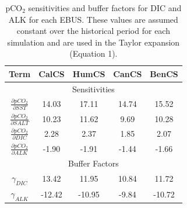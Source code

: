 \documentclass[12pt]{article}
\begin{document}
\clearpage
\begin{table}
	\centering
	\caption{pCO$_{2}$ sensitivities and buffer factors for DIC and ALK for each EBUS. These values are assumed constant over the historical period for each simulation and are used in the Taylor expansion (Equation 1).}	
	\begin{tabular}{c c c c c}
		\toprule
		Term & CalCS  &  HumCS &  CanCS & BenCS \\
		\midrule
		\multicolumn{5}{c}{Sensitivities}  \\[0.1cm]
		$\frac{\partial pCO_{2}}{\partial SST}$ &  14.03 & 17.11  & 14.74 & 15.52 \\ [0.5cm]
		$\frac{\partial pCO_{2}}{\partial SALT}$ &  10.23 & 11.62 & 9.69 & 10.28 \\ [0.5cm]
		$\frac{\partial pCO_{2}}{\partial DIC}$ &  2.28 & 2.37 & 1.85 & 2.07 \\ [0.5cm]
		$\frac{\partial pCO_{2}}{\partial ALK}$ &  -1.90 & -1.91 & -1.44 & -1.66 \\ 
		\midrule
		\multicolumn{5}{c}{Buffer Factors}  \\ [0.1cm]
		$\gamma_{DIC}$ & 13.42 & 11.95 & 10.84 & 11.72 \\ [0.5cm]
		$\gamma_{ALK}$ & -12.42 & -10.95 & -9.84 & -10.72 \\ 
		\bottomrule
	\end{tabular}
	\label{tab:pCO2-sensitivities}
\end{table}
\end{document}
